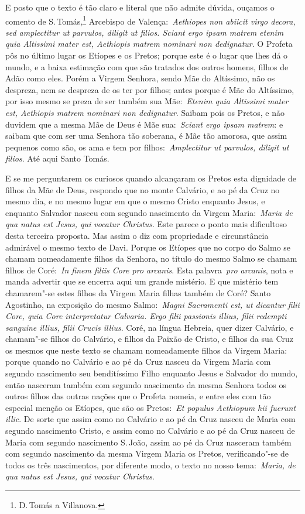E posto que o texto é tão claro e literal que não admite
dúvida, ouçamos o comento de S.\,Tomás,\footnote{D.\,Tomás a Villanova.} Arcebispo de
Valença:~\emph{Aethiopes non abiicit virgo decora, sed amplectitur ut
parvulos, diligit ut filios. Sciant ergo ipsam matrem etenim quia
Altissimi mater est, Aethiopis matrem nominari non dedignatur}. O
Profeta pôs no último lugar os Etíopes e os Pretos; porque este é o
lugar que lhes dá o mundo, e a baixa estimação com que são tratados dos
outros homens, filhos de Adão como eles. Porém a Virgem Senhora, sendo
Mãe do Altíssimo, não os despreza, nem se despreza de os ter por filhos;
antes porque é Mãe do Altíssimo, por isso mesmo se preza de ser também
sua Mãe:~\emph{Etenim quia Altissimi mater est, Aethiopis matrem
nominari non dedignatur}. Saibam pois os Pretos, e não duvidem que a
mesma Mãe de Deus é Mãe sua:~\emph{Sciant ergo ipsam matrem}: e saibam
que com ser uma Senhora tão soberana, é Mãe tão amorosa, que assim
pequenos como são, os ama e tem por filhos:~\emph{Amplectitur ut
parvulos, diligit ut filios}. Até aqui Santo Tomás.

E se me perguntarem os curiosos quando alcançaram os Pretos
esta dignidade de filhos da Mãe de Deus, respondo que no monte Calvário,
e ao pé da Cruz no mesmo dia, e no mesmo lugar em que o mesmo Cristo
enquanto Jesus, e enquanto Salvador nasceu com segundo nascimento da
Virgem Maria:~\emph{Maria de qua natus est Jesus, qui vocatur Christus}.
Este parece o ponto mais dificultoso desta terceira proposta. Mas assim
o diz com propriedade e circunstância admirável o mesmo texto de Davi.
Porque os Etíopes que no corpo do Salmo se chamam nomeadamente filhos da
Senhora, no título do mesmo Salmo se chamam filhos de Coré:~\emph{In
finem filiis Core pro arcanis}. Esta palavra~\emph{pro arcanis}, nota e
manda advertir que se encerra aqui um grande mistério. E que mistério
tem chamarem"-se estes filhos da Virgem Maria filhas também de Coré?
Santo Agostinho, na exposição do mesmo Salmo:~\emph{Magni Sacramenti
est, ut dicantur filii Core, quia Core interpretatur Calvaria. Ergo
filii passionis illius, filii redempti sanguine illius, filii Crucis
illius}. Coré, na língua Hebreia, quer dizer Calvário,
e chamam"-se filhos do Calvário, e filhos da Paixão de Cristo, e filhos
da sua Cruz os mesmos que neste texto se chamam nomeadamente filhos da
Virgem Maria: porque quando no Calvário e ao pé da Cruz nasceu da Virgem
Maria com segundo nascimento seu benditíssimo Filho enquanto Jesus e
Salvador do mundo, então nasceram também com segundo nascimento da mesma
Senhora todos os outros filhos das outras nações que o Profeta nomeia, e
entre eles com tão especial menção os Etíopes, que são os
Pretos:~\emph{Et populus Aethiopum hii fuerunt illic}. De sorte que
assim como no Calvário e ao pé da Cruz nasceu de Maria com segundo
nascimento Cristo, e assim como no Calvário e ao pé da Cruz nasceu de
Maria com segundo nascimento S.\,João, assim ao pé da Cruz nasceram
também com segundo nascimento da mesma Virgem Maria os Pretos,
verificando"-se de todos os três nascimentos, por diferente modo, o texto
no nosso tema:~\emph{Maria, de qua natus est Jesus, qui vocatur
Christus}.


